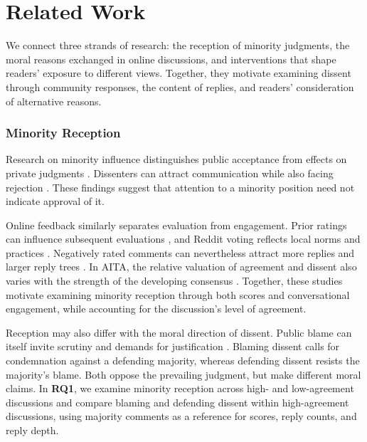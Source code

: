 
\section{Related Work}
\label{sec:related-work}

We connect three strands of research: the reception of minority judgments,
the moral reasons exchanged in online discussions, and interventions that
shape readers' exposure to different views. Together, they motivate
examining dissent through community responses, the content of replies,
and readers' consideration of alternative reasons.

\subsubsection*{Minority Reception}

Research on minority influence distinguishes public acceptance from
effects on private judgments \cite{wood1994minority}. Dissenters can
attract communication while also facing rejection
\cite{schachter1951deviation}. These findings suggest that attention
to a minority position need not indicate approval of it.

Online feedback similarly separates evaluation from engagement.
Prior ratings can influence subsequent evaluations
\cite{muchnik2013social}, and Reddit voting reflects local norms
and practices \cite{graham2021sociomateriality}. Negatively rated
comments can nevertheless attract more replies and larger reply
trees \cite{davis2021emotional}. In AITA, the relative valuation
of agreement and dissent also varies with the strength of the
developing consensus \cite{mellody2025consensus}. Together, these
studies motivate examining minority reception through both scores
and conversational engagement, while accounting for the discussion's
level of agreement.

Reception may also differ with the moral direction of dissent.
Public blame can itself invite scrutiny and demands for justification
\cite{malle2022socially}. Blaming dissent calls for condemnation
against a defending majority, 
whereas defending dissent resists
the majority's blame. Both oppose the prevailing judgment, but make
different moral claims. In \textbf{RQ1}, we examine minority reception
across high- and low-agreement discussions and compare blaming and
defending dissent within high-agreement discussions, using majority
comments as a reference for scores, reply counts, and reply depth.


